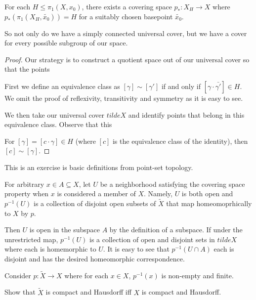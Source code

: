 \documentclass[10pt]{article}
\begin{document}
\begin{theorem}
	For each $H \leq \pi_1(X, x_0)$, there exists a covering space $p_*: X_H \to
	X$ where $p_*(\pi_1(X_H, \tilde{x_0})) = H$ for a suitably chosen basepoint
	$\tilde{x_0}$. 
\end{theorem}

So not only do we have a simply connected universal cover, but we have a cover
for every possible subgroup of our space. 

\begin{proof}

	Our strategy is to construct a quotient space out of our universal cover so
	that the points 

	First we define an equivalence class as $[\gamma] \sim [\gamma']$ if and only
	if $[\gamma \cdot \bar{\gamma'}] \in H$. We omit the proof of reflexivity,
	transitivity and symmetry as it is easy to see.

	We then take our universal cover $tilde{X}$ and identify points that belong
	in this equivalence class. Observe that this 

	For $[\gamma] = [c \cdot \gamma] \in H$ (where $[c]$ is the equivalence class
	of the identity), then $[c] \sim [\gamma]$.

\end{proof}


\begin{exercise}[1.3.1]
	This is an exercise is basic definitions from point-set topology.

	For arbitrary $x \in A \subseteq X$, let $U$ be a neighborhood satisfying the
	covering space property when $x$ is considered a member of $X$. Namely, $U$
	is both open and $p^{-1}(U)$ is a collection of disjoint open subsets of
	$\tilde{X}$ that map homeomoprhically to $X$ by $p$.

	Then $U$ is open in the subspace $A$ by the definition of a subspace.
	If under the unrestricted map, $p^{-1}(U)$ is a collection of open and disjoint
	sets in $tilde{X}$ where each is homemorphic to $U$. It is easy to see that
	$p^{-1}(U \cap A)$ each is disjoint and has the desired homeomorphic
	correspondence. 

\end{exercise}

\begin{exercise}[1.3.3]

	Consider $p: \tilde{X} \to X$ where for each $x \in X$, $p^{-1}(x)$ is
	non-empty and finite.

	Show that $\tilde{X}$ is compact and Hausdorff iff $X$ is compact and
	Hausdorff.
\end{exercise}
\end{document}
